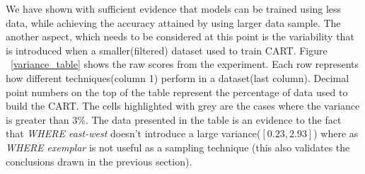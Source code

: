 \documentclass{sig-alternative}
\begin{document}
We have shown with sufficient evidence that models can be trained using less data, while achieving the accuracy attained by using larger data sample. 
The another aspect, which needs to be considered at this point is the variability that is introduced  when a smaller(filtered) dataset used to train CART. 
Figure ~\ref{variance_table} shows the raw scores from the experiment. Each row represents how different techniques(column 1) perform in a dataset(last column). Decimal point numbers on the top of the table represent the percentage of data used to build the CART. The cells highlighted with grey are the cases where the variance is greater than 3\%. The data presented in the table is an evidence to the fact  that \textit{WHERE east-west} doesn't introduce a large variance($[0.23, 2.93]$) where as \textit{WHERE exemplar} is not useful as a sampling technique (this also validates the conclusions drawn in the previous section). 
\end{document}
